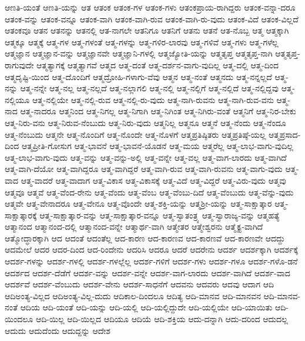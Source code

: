 {ಆಣತಿ-ಯಂತೆ
ಆಣತಿ-ಯನ್ನು
ಆತ
ಆತಂಕ
ಆತಂಕ-ಗಳ
ಆತಂಕ-ಗಳು
ಆತಂಕಪ್ರಾಯ-ರಾಗಿದ್ದರು
ಆತಂಕ-ವನ್ನಾ-ದರೂ
ಆತಂಕ-ವನ್ನು
ಆತಂಕ-ವನ್ನೂ
ಆತಂಕ-ವಾಗಿ
ಆತಂಕ-ವಾಗಿ-ರುವ
ಆತಂಕ-ವಾಗಿ-ರು-ವುದು
ಆತಂಕ-ವಿದೆ
ಆತಂಕ-ವಿಲ್ಲದೆ
ಆತಂಕವೂ
ಆತನ
ಆತನನ್ನು
ಆತನಲ್ಲಿ
ಆತ-ನಾಗಲೇ
ಆತನಿಗೂ
ಆತನಿಗೆ
ಆತನು
ಆತನೆ
ಆತ-ನೊಬ್ಬ
ಆತ್ಮ
ಆತ್ಮಕ್ಕಾಗಿ
ಆತ್ಮಕ್ಕೂ
ಆತ್ಮಕ್ಕೆ
ಆತ್ಮ-ಗಳ
ಆತ್ಮ-ಗಳಂತೆ
ಆತ್ಮ-ಗಳನ್ನು
ಆತ್ಮ-ಗಳಿರ-ಲಾರವು
ಆತ್ಮ-ಗಳಿವೆ
ಆತ್ಮ-ಗಳು
ಆತ್ಮ-ಗಳೆಲ್ಲ
ಆತ್ಮಜ್ಞಾನ
ಆತ್ಮಜ್ಞಾನ-ವನ್ನು
ಆತ್ಮಜ್ಞಾನವೇ
ಆತ್ಮಜ್ಞಾನಿ-ಗಳಲ್ಲಿ
ಆತ್ಮಜ್ಯೋತಿ-ಯನ್ನು
ಆತ್ಮತೃಪ್ತ
ಆತ್ಮತೃಪ್ತ-ನಾಗಿ
ಆತ್ಮತೃಪ್ತ-ರಾಗುವುದೇ
ಆತ್ಮತ್ಯಾಗಕ್ಕೆ
ಆತ್ಮತ್ಯಾಗವೆ
ಆತ್ಮದ
ಆತ್ಮ-ದಂತೆ
ಆತ್ಮ-ದರ್ಶನ-ವಾಗು-ವುದಿಲ್ಲ
ಆತ್ಮ-ದಲ್ಲಿ
ಆತ್ಮ-ದಿಂದ
ಆತ್ಮದೃಷ್ಟಿ-ಯಿಂದ
ಆತ್ಮ-ದೊಂದಿಗೆ
ಆತ್ಮದ್ರೋಹಿ-ಗಳಾಗು-ವೆವು
ಆತ್ಮನ
ಆತ್ಮ-ನಂತೆ
ಆತ್ಮನದು
ಆತ್ಮ-ನನ್ನಲ್ಲದೆ
ಆತ್ಮ-ನನ್ನು
ಆತ್ಮ-ನನ್ನೇ
ಆತ್ಮ-ನಲ್ಲ
ಆತ್ಮ-ನಲ್ಲದೆ
ಆತ್ಮ-ನಲ್ಲಾಗಲಿ
ಆತ್ಮ-ನಲ್ಲಿ
ಆತ್ಮ-ನಲ್ಲಿಗೆ
ಆತ್ಮ-ನಲ್ಲಿದೆ
ಆತ್ಮ-ನಲ್ಲಿದ್ದವು
ಆತ್ಮ-ನಲ್ಲಿಯೂ
ಆತ್ಮ-ನಲ್ಲಿಯೇ
ಆತ್ಮ-ನಲ್ಲಿ-ರುವ
ಆತ್ಮ-ನಲ್ಲಿ-ರು-ವುದು
ಆತ್ಮ-ನಾಗಿ-ರುವನು
ಆತ್ಮ-ನಾಗಿ-ರುವ-ವನು
ಆತ್ಮ-ನಾದ
ಆತ್ಮ-ನಾದರೂ
ಆತ್ಮನಿಂದ
ಆತ್ಮ-ನಿಗಲ್ಲ
ಆತ್ಮ-ನಿಗಾಗಿ
ಆತ್ಮ-ನಿಗಿಂತ
ಆತ್ಮ-ನಿಗಿರು-ವಂತೆ
ಆತ್ಮನಿಗೆ
ಆತ್ಮ-ನಿರ-ಬೇಕು
ಆತ್ಮ-ನಿರು-ವನು
ಆತ್ಮ-ನಿರುವ-ನೆಂಬುದು
ಆತ್ಮ-ನಿರು-ವುದು
ಆತ್ಮನಿಲ್ಲ
ಆತ್ಮನೂ
ಆತ್ಮನೆ
ಆತ್ಮ-ನೆಂದು
ಆತ್ಮ-ನೆಂದೂ
ಆತ್ಮ-ನೆಂಬುದು
ಆತ್ಮನೇ
ಆತ್ಮ-ನೊಂದಿಗೆ
ಆತ್ಮ-ನೊಂದೇ
ಆತ್ಮ-ನೊಳಗೆ
ಆತ್ಮಪ್ರತಿಷ್ಠಿತರು
ಆತ್ಮಪ್ರತಿಷ್ಠೆ-ಯಲ್ಲ
ಆತ್ಮಪ್ರಸಾದ-ದಿಂದ
ಆತ್ಮಪ್ರೀತಿ-ಗೋಸುಗ
ಆತ್ಮ-ಭಾವನೆ
ಆತ್ಮ-ಭಾವನೆ-ಯೊಡನೆ
ಆತ್ಮ-ಮಯ
ಆತ್ಮರೆಲ್ಲ
ಆತ್ಮ-ಲಾಭ-ವಾಗು-ವುದಿಲ್ಲ
ಆತ್ಮ-ಲಾಭ-ವಾಗು-ವುದು
ಆತ್ಮ-ವನ್ನು
ಆತ್ಮ-ವನ್ನು-ಅಲ್ಲಿ
ಆತ್ಮ-ವನ್ನೇ
ಆತ್ಮ-ವಲ್ಲ
ಆತ್ಮ-ವಾಗ-ಲಾರದು
ಆತ್ಮ-ವಾಗಿದೆ
ಆತ್ಮ-ವಾಗಿ-ದೆಯೋ
ಆತ್ಮ-ವಾಗಿದ್ದರೂ
ಆತ್ಮ-ವಾಗಿದ್ದರೆ
ಆತ್ಮ-ವಾಗಿ-ರುವ
ಆತ್ಮ-ವಾಗಿ-ರುವನು
ಆತ್ಮ-ವಾಗು-ವುದು
ಆತ್ಮ-ವಾದ
ಆತ್ಮ-ವಾದರೆ
ಆತ್ಮ-ವಾದಾಗ
ಆತ್ಮ-ವಿಕಾಸ
ಆತ್ಮ-ವಿಕಾಸಕ್ಕೆ
ಆತ್ಮ-ವಿದೆ
ಆತ್ಮ-ವಿದ್ದರೆ
ಆತ್ಮ-ವಿರು-ವುದು
ಆತ್ಮವು
ಆತ್ಮವೂ
ಆತ್ಮವೆ
ಆತ್ಮ-ವೆಂದ-ರೇನು
ಆತ್ಮ-ವೆಂದು
ಆತ್ಮ-ವೆಂಬ
ಆತ್ಮ-ವೆಂಬು-ದಿದೆ
ಆತ್ಮ-ವೆಂಬುದು
ಆತ್ಮ-ವೆನ್ನು-ವುದು
ಆತ್ಮವೇ
ಆತ್ಮ-ವೇನಾದರೂ
ಆತ್ಮ-ವೇನೂ
ಆತ್ಮ-ವೊಂದೇ
ಆತ್ಮ-ಶಕ್ತಿ-ಯನ್ನು
ಆತ್ಮಶ್ರೀ-ಯನ್ನು
ಆತ್ಮ-ಸಾಕ್ಷಾತ್ಕಾರ
ಆತ್ಮ-ಸಾಕ್ಷಾತ್ಕಾರಕ್ಕೆ
ಆತ್ಮ-ಸಾಕ್ಷಾತ್ಕಾರ-ವನ್ನು
ಆತ್ಮ-ಸಾಕ್ಷಾತ್ಕಾರ-ವನ್ನೂ
ಆತ್ಮ-ಸ್ವಾತಂತ್ರ್ಯ
ಆತ್ಮ-ಸ್ವಾರಾಜ್ಯ-ವನ್ನು
ಆತ್ಮಹತ್ಯೆ
ಆತ್ಮಾನಂದ
ಆತ್ಮಾನಂದ-ದಲ್ಲಿ
ಆತ್ಮಾನಂದ-ವನ್ನೇ
ಆತ್ಮಾರ್ಥ-ವಾಗಿ
ಆತ್ಮೇತರ
ಆತ್ಮೇಶ್ವರನು
ಆತ್ಮೈಕ್ಯ-ವಾಗಿದೆ
ಆತ್ಮೋದ್ಧಾರಕ್ಕಾಗಿ
ಆದ
ಆದಂತೆ
ಆದಂತೆಲ್ಲ
ಆದ-ಕಾರಣ
ಆದ-ಕಾರಣವ
ಆದ-ಕಾರಣವೆ
ಆದ-ಕಾರಣವೇ
ಆದದ್ದು
ಆದಮೇಲೆ
ಆದರ
ಆದರ-ದಿಂದ
ಆದ-ರಿಂದೇನು
ಆದರಿಸಿ
ಆದರೂ
ಆದರೆ
ಆದರೇನು
ಆದರ್ಶ
ಆದರ್ಶಕ್ಕಾಗಿ
ಆದರ್ಶಕ್ಕೆ
ಆದರ್ಶ-ಗಳನ್ನು
ಆದರ್ಶ-ಗಳಲ್ಲಿ
ಆದರ್ಶ-ಗಳಲ್ಲೆಲ್ಲ
ಆದರ್ಶ-ಗಳಿಗೆ
ಆದರ್ಶ-ಗಳು
ಆದರ್ಶ-ಗಳೂ
ಆದರ್ಶ-ಗಳೊ-ಡನೆ
ಆದರ್ಶದ
ಆದರ್ಶ-ದೆಡೆಗೆ
ಆದರ್ಶ-ವನ್ನು
ಆದರ್ಶ-ವನ್ನೇ
ಆದರ್ಶ-ವಾಗ-ಲಾರದು
ಆದರ್ಶ-ವಾಗಿದೆ
ಆದರ್ಶ-ವಾದ
ಆದರ್ಶವೆ
ಆದರ್ಶ-ವೆಂಬುದು
ಆದರ್ಶ-ವೇನು
ಆದರ್ಶ-ಸಾಧನೆಗೆ
ಆದವನು
ಆದವರು
ಆದವು
ಆದಾಗ
ಆದಿ
ಆದಿಅಂತ್ಯ-ವಿಲ್ಲದ
ಆದಿಅಂತ್ಯ-ವಿಲ್ಲ-ದುದು
ಆದಿಕಾಲ-ದಿಂದಲೂ
ಆದಿತ್ಯ
ಆದಿ-ಮಾನವ
ಆದಿ-ಮಾನವನ
ಆದಿ-ಮಾನವ-ನಂತೆ
ಆದಿಯ
ಆದಿ-ಯಂತೆ
ಆದಿ-ಯನ್ನು
ಆದಿ-ಯಲ್ಲಿ
ಆದಿ-ಯಲ್ಲಿದ್ದುದೇ
ಆದಿ-ಯಲ್ಲಿಯೇ
ಆದಿ-ಯಾಯಿತು
ಆದಿ-ಯಿಂದಲೂ
ಆದಿ-ಯಿಲ್ಲ
ಆದಿ-ಯಿಲ್ಲದ
ಆದಿಯೂ
ಆದಿಯೆ
ಆದಿ-ಶಕ್ತಿಯ
ಆದು-ದನ್ನಾಗಿ
ಆದು-ದರಿಂದ
ಆದುದಲ್ಲ
ಆದುದು
ಆದುದೆಂದು
ಆದುದ್ದನ್ನು
ಆದೇಶ
}
